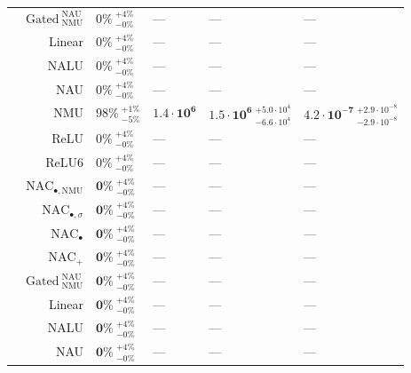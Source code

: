 \begin{longtable}{crllll}
\nopagebreak
 & $\mathrm{Gated~}^{\mathrm{NAU}}_{\mathrm{NMU}}$ & $0\% {~}^{+4\%}_{-0\%}$ & --- & --- & ---\\

\nopagebreak
 & Linear & $0\% {~}^{+4\%}_{-0\%}$ & --- & --- & ---\\

\nopagebreak
 & NALU & $0\% {~}^{+4\%}_{-0\%}$ & --- & --- & ---\\

\nopagebreak
 & NAU & $0\% {~}^{+4\%}_{-0\%}$ & --- & --- & ---\\

\nopagebreak
 & NMU & $98\% {~}^{+1\%}_{-5\%}$ & $\mathbf{1.4 \cdot 10^{6}}$ & $\mathbf{1.5 \cdot 10^{6}} {~}^{+5.0 \cdot 10^{4}}_{-6.6 \cdot 10^{4}}$ & $\mathbf{4.2 \cdot 10^{-7}} {~}^{+2.9 \cdot 10^{-8}}_{-2.9 \cdot 10^{-8}}$\\

\nopagebreak
 & ReLU & $0\% {~}^{+4\%}_{-0\%}$ & --- & --- & ---\\

\nopagebreak
\multirow{-11}{*}{\centering\arraybackslash $\bm{\times}$} & ReLU6 & $0\% {~}^{+4\%}_{-0\%}$ & --- & --- & ---\\
\cmidrule{1-6}
 & $\mathrm{NAC}_{\bullet,\mathrm{NMU}}$ & $\mathbf{0\%} {~}^{+4\%}_{-0\%}$ & --- & --- & ---\\

\nopagebreak
 & $\mathrm{NAC}_{\bullet,\sigma}$ & $\mathbf{0\%} {~}^{+4\%}_{-0\%}$ & --- & --- & ---\\

\nopagebreak
 & $\mathrm{NAC}_{\bullet}$ & $\mathbf{0\%} {~}^{+4\%}_{-0\%}$ & --- & --- & ---\\

\nopagebreak
 & $\mathrm{NAC}_{+}$ & $\mathbf{0\%} {~}^{+4\%}_{-0\%}$ & --- & --- & ---\\

\nopagebreak
 & $\mathrm{Gated~}^{\mathrm{NAU}}_{\mathrm{NMU}}$ & $\mathbf{0\%} {~}^{+4\%}_{-0\%}$ & --- & --- & ---\\

\nopagebreak
 & Linear & $\mathbf{0\%} {~}^{+4\%}_{-0\%}$ & --- & --- & ---\\

\nopagebreak
 & NALU & $\mathbf{0\%} {~}^{+4\%}_{-0\%}$ & --- & --- & ---\\

\nopagebreak
 & NAU & $\mathbf{0\%} {~}^{+4\%}_{-0\%}$ & --- & --- & ---\\


\end{longtable}

